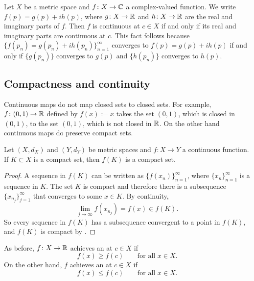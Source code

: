 \begin{example}
Let $X$ be a metric space and $f \colon X \to {\mathbb{C}}$ a complex-valued
function.  We write $f(p) = g(p) + i h(p)$, where $g \colon X \to {\mathbb{R}}$
and $h \colon X \to {\mathbb{R}}$ are the real and imaginary parts of $f$.
Then $f$ is continuous at $c \in X$ if and only if its real
and imaginary parts are continuous at $c$.  
This fact follows because $\{ f(p_n) = g(p_n) + i h(p_n) \}_{n=1}^\infty$
converges to $f(p) = g(p) + i h(p)$ if and only if
$\{ g(p_n) \}$ converges to $g(p)$ and
$\{ h(p_n) \}$ converges to $h(p)$.
\end{example}

\subsection{Compactness and continuity}

Continuous maps do not map closed sets to closed sets.  For example,
$f \colon (0,1) \to {\mathbb{R}}$ defined by $f(x) := x$ takes the set $(0,1)$, which
is closed in $(0,1)$, to the set $(0,1)$, which is not closed in ${\mathbb{R}}$.
On the other hand continuous maps do preserve compact sets.

\begin{lemma} \label{lemma:continuouscompact}
Let $(X,d_X)$ and $(Y,d_Y)$ be metric spaces
and $f \colon X \to Y$ a continuous function.  If
$K \subset X$ is a compact set, then $f(K)$ is a compact set.
\end{lemma}

\begin{proof}
A sequence in $f(K)$ can be written as
$\{ f(x_n) \}_{n=1}^\infty$, where
$\{ x_n \}_{n=1}^\infty$ is a sequence in $K$.  The set $K$ is compact and
therefore there is a subsequence
$\{ x_{n_j} \}_{j=1}^\infty$ that converges to some $x \in K$.
By continuity,
\begin{equation*}
\lim_{j\to\infty} f(x_{n_j}) = f(x) \in f(K) .
\end{equation*}
So every sequence in $f(K)$ has a subsequence convergent to 
a point in $f(K)$, and $f(K)$ is compact by .
\end{proof}

As before, $f \colon X \to {\mathbb{R}}$ achieves an
\emph{} at $c \in X$ if
\begin{equation*}
f(x) \geq f(c) \qquad \text{for all } x \in X.
\end{equation*}
On the other hand, $f$ achieves an 
\emph{} at $c \in X$ if
\begin{equation*}
f(x) \leq f(c) \qquad \text{for all } x \in X.
\end{equation*}

